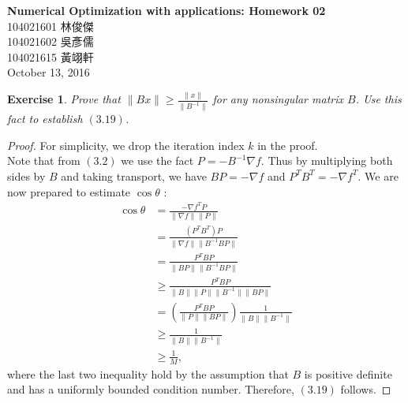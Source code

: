 \documentclass[11pt,a4paper]{article}
\renewcommand{\(}{\left(}
\renewcommand{\)}{\right)}
\renewcommand{\title}{Numerical Optimization with applications: Homework 02}
\renewcommand{\author}{104021601 林俊傑\\104021602 吳彥儒\\104021615 黃翊軒}
\renewcommand{\maketitle}{\begin{center}\textbf{\Large\title}\\[6pt] {\author}\\[6pt] {\color{Gray}\footnotesize October 13, 2016}\end{center}}
\newtheorem{exercise}{Exercise}
\begin{document}
  \maketitle

  \setcounter{exercise}{4}  
  \begin{exercise}
  	 Prove that $\| Bx\| \ge \frac{\lVert x\|}{\|B^{-1}\|}$ for any nonsingular matrix $B$. Use this fact to
  	 establish $(3.19)$.
  \end{exercise}  
  \begin{proof}
  	For simplicity, we drop the iteration index $k$ in the proof.\\
  	Note that from $\(3.2\)$ we use the fact $P = -B^{-1}\nabla f$. Thus by multiplying both sides by $B$ and taking transport, we have $BP=-\nabla f$ and $P^T B^T = -\nabla f^T$. We are now  prepared to estimate $\cos \theta$ :
	\begin{align*}
	\cos \theta
	&= \frac{-\nabla f^T P}{\|\nabla f\| \|P\|}\\
	&= \frac{\(P^TB^T\)P}{\|\nabla f\|\|B^{-1}BP\|}\\
	&= \frac{P^TBP}{\|BP\|\|B^{-1}BP\|}\\
	&\ge \frac{P^TBP}{\|B\|\|P\|\|B^{-1}\|\|BP\|}\\
	&= \left(\frac{P^TBP}{\|P\|\|BP\|} \right)\frac{1}{\|B\|\|B^{-1}\|}\\
	&\ge \frac{1}{\|B\|\|B^{-1}\|} \\
	&\ge \frac{1}{M},
	\end{align*}  
	where the last two inequality hold by the assumption that $B$ is positive definite and has a uniformly bounded condition number. Therefore, $\(3.19\)$ follows.
  \end{proof}
  
\end{document}

